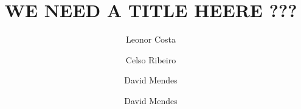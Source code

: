 \title{WE NEED A TITLE HEERE ???}

\author[first]{Leonor Costa}
\author[second]{Celso Ribeiro}
\author[third]{David Mendes}
\author[fourth]{David Mendes}
